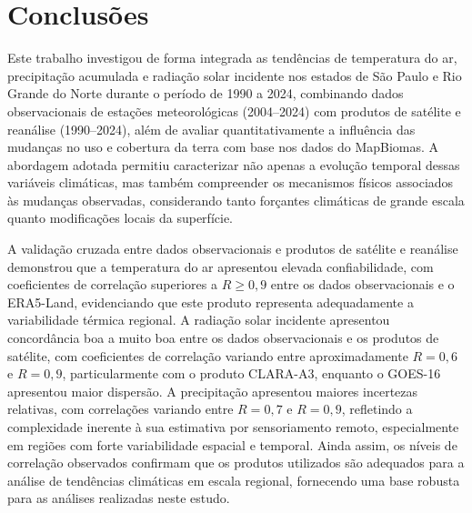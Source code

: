 \chapter{Conclusões}
\label{cap:conclusoes}

Este trabalho investigou de forma integrada as tendências de temperatura do ar, precipitação acumulada e radiação solar incidente nos estados de São Paulo e Rio Grande do Norte durante o período de 1990 a 2024, combinando dados observacionais de estações meteorológicas (2004–2024) com produtos de satélite e reanálise (1990–2024), além de avaliar quantitativamente a influência das mudanças no uso e cobertura da terra com base nos dados do MapBiomas. A abordagem adotada permitiu caracterizar não apenas a evolução temporal dessas variáveis climáticas, mas também compreender os mecanismos físicos associados às mudanças observadas, considerando tanto forçantes climáticas de grande escala quanto modificações locais da superfície.

A validação cruzada entre dados observacionais e produtos de satélite e reanálise demonstrou que a temperatura do ar apresentou elevada confiabilidade, com coeficientes de correlação superiores a $R \geq 0{,}9$ entre os dados observacionais e o ERA5-Land, evidenciando que este produto representa adequadamente a variabilidade térmica regional. A radiação solar incidente apresentou concordância boa a muito boa entre os dados observacionais e os produtos de satélite, com coeficientes de correlação variando entre aproximadamente $R = 0{,}6$ e $R = 0{,}9$, particularmente com o produto CLARA-A3, enquanto o GOES-16 apresentou maior dispersão. A precipitação apresentou maiores incertezas relativas, com correlações variando entre $R = 0{,}7$ e $R = 0{,}9$, refletindo a complexidade inerente à sua estimativa por sensoriamento remoto, especialmente em regiões com forte variabilidade espacial e temporal. Ainda assim, os níveis de correlação observados confirmam que os produtos utilizados são adequados para a análise de tendências climáticas em escala regional, fornecendo uma base robusta para as análises realizadas neste estudo.

